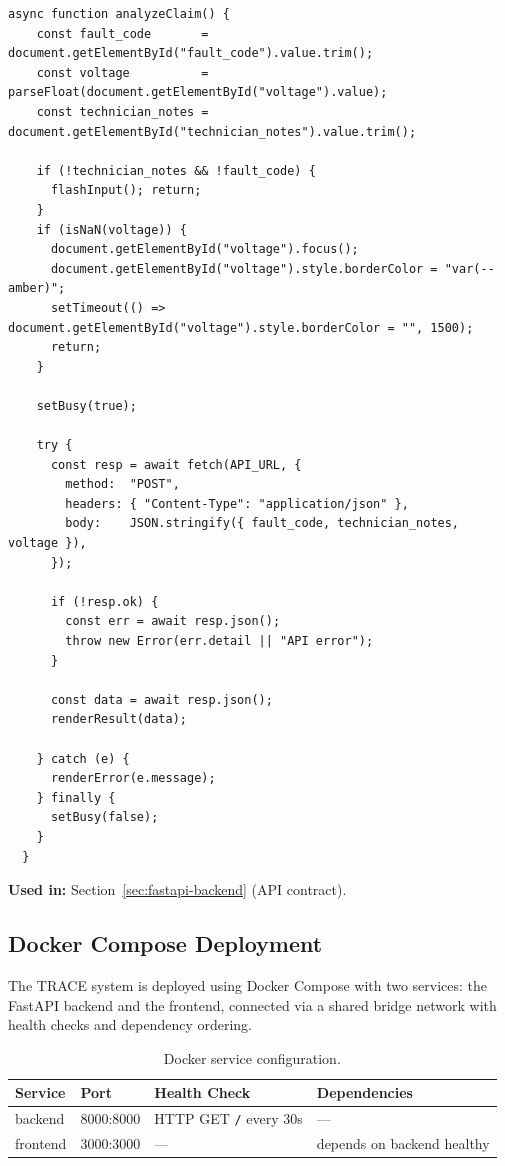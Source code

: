 \documentclass[10pt,a4paper]{article}
\begin{document}
\begin{lstlisting}[style=JavaScript]
async function analyzeClaim() {
    const fault_code       = document.getElementById("fault_code").value.trim();
    const voltage          = parseFloat(document.getElementById("voltage").value);
    const technician_notes = document.getElementById("technician_notes").value.trim();

    if (!technician_notes && !fault_code) {
      flashInput(); return;
    }
    if (isNaN(voltage)) {
      document.getElementById("voltage").focus();
      document.getElementById("voltage").style.borderColor = "var(--amber)";
      setTimeout(() => document.getElementById("voltage").style.borderColor = "", 1500);
      return;
    }

    setBusy(true);

    try {
      const resp = await fetch(API_URL, {
        method:  "POST",
        headers: { "Content-Type": "application/json" },
        body:    JSON.stringify({ fault_code, technician_notes, voltage }),
      });

      if (!resp.ok) {
        const err = await resp.json();
        throw new Error(err.detail || "API error");
      }

      const data = await resp.json();
      renderResult(data);

    } catch (e) {
      renderError(e.message);
    } finally {
      setBusy(false);
    }
  }
\end{lstlisting}

\textbf{Used in:} Section~\ref{sec:fastapi-backend} (API contract).

\subsection{Docker Compose Deployment}
\label{sec:docker-compose}

The TRACE system is deployed using Docker Compose with two services: the FastAPI backend and the frontend, connected via a shared bridge network with health checks and dependency ordering.

\begin{table}[H]
\centering
\caption{Docker service configuration.}
\label{tab:docker-services}
\begin{tabular}{llp{3cm}p{4cm}}
\toprule
\textbf{Service} & \textbf{Port} & \textbf{Health Check} & \textbf{Dependencies} \\
\midrule
backend  & 8000:8000 & HTTP GET \texttt{/} every 30s & --- \\
frontend & 3000:3000 & --- & depends on backend healthy \\
\bottomrule
\end{tabular}
\end{table}
\end{document}
